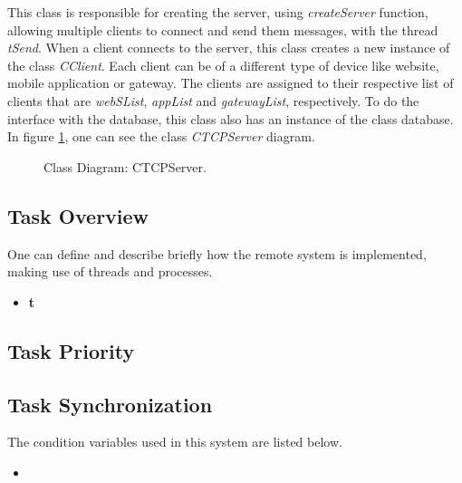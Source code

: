 This class is responsible for creating the server, using \textit{createServer} function, allowing multiple clients to connect and send them messages, with the thread \textit{tSend}. When a client connects to the server, this class creates a new instance of the class \textit{CClient}. Each client can be of a different type of device like website, mobile application or gateway. The clients are assigned to their respective list of clients that are \textit{webSList}, \textit{appList} and \textit{gatewayList}, respectively. To do the interface with the database, this class also has an instance of the class database. In figure \ref{fig:CTCPServer}, one can see the class \textit{CTCPServer} diagram.

\begin{figure}[H]
	\centering
	\caption{Class Diagram: CTCPServer.}
	\label{fig:CTCPServer}
\end{figure}


\subsection{Task Overview}
One can define and describe briefly how the remote system is implemented, making use of threads and processes. 

\begin{itemize}
	\item \textbf{t}
\end{itemize}

\subsection{Task Priority}

\subsection{Task Synchronization}

The condition variables used in this system are listed below.

\begin{itemize}
	\item
		
\end{itemize}

